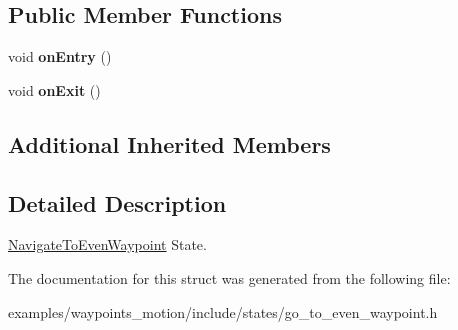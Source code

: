 \subsection*{Public Member Functions}
\begin{DoxyCompactItemize}
\item 
void {\bfseries on\+Entry} ()\hypertarget{structNavigateToEvenWaypoint_1_1NavigateToEvenWaypoint_a2b03368922b1ec0f2e27843ef8f4e46f}{}\label{structNavigateToEvenWaypoint_1_1NavigateToEvenWaypoint_a2b03368922b1ec0f2e27843ef8f4e46f}

\item 
void {\bfseries on\+Exit} ()\hypertarget{structNavigateToEvenWaypoint_1_1NavigateToEvenWaypoint_ac479165ac75b4edcd92125ff2b7c0bb3}{}\label{structNavigateToEvenWaypoint_1_1NavigateToEvenWaypoint_ac479165ac75b4edcd92125ff2b7c0bb3}

\end{DoxyCompactItemize}
\subsection*{Additional Inherited Members}


\subsection{Detailed Description}
\hyperlink{structNavigateToEvenWaypoint_1_1NavigateToEvenWaypoint}{Navigate\+To\+Even\+Waypoint} State. 

The documentation for this struct was generated from the following file\+:\begin{DoxyCompactItemize}
\item 
examples/waypoints\+\_\+motion/include/states/go\+\_\+to\+\_\+even\+\_\+waypoint.\+h\end{DoxyCompactItemize}
